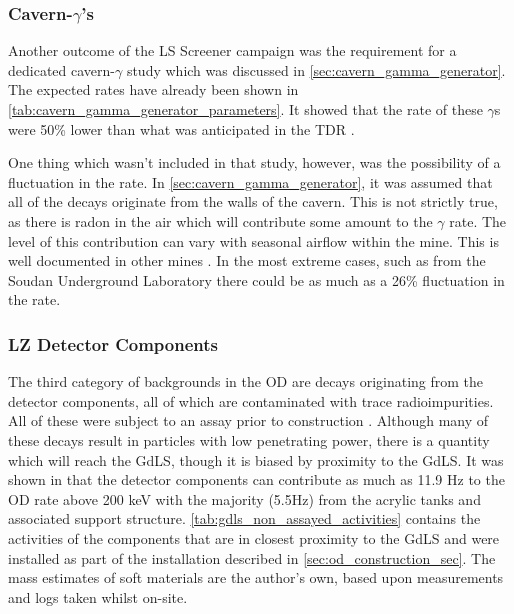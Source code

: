 


\subsubsection{Cavern-$\gamma$'s}
\par
Another outcome of the LS Screener campaign was the requirement for a dedicated cavern-$\gamma$ study which was discussed in \autoref{sec:cavern_gamma_generator}.
The expected rates have already been shown in \autoref{tab:cavern_gamma_generator_parameters}.
It showed that the rate of these $\gamma$s were 50\% lower than what was anticipated in the TDR \cite{LZ_TechnicalDesignReview_ref}.
\par
One thing which wasn't included in that study, however, was the possibility of a fluctuation in the rate.
In \autoref{sec:cavern_gamma_generator}, it was assumed that all of the decays originate from the walls of the cavern.
This is not strictly true, as there is radon in the air which will contribute some amount to the $\gamma$ rate.
The level of this contribution can vary with seasonal airflow within the mine.
This is well documented in other mines \cite{finnish_mine_radon_ref,nepal_mine_radon_ref,minos_annual_modulation_ref}.
In the most extreme cases, such as from the Soudan Underground Laboratory \cite{cavern_gammas_in_Soudan_mine_ref} there could be as much as a 26\% fluctuation in the rate.

\subsubsection{LZ Detector Components}
\par
The third category of backgrounds in the OD are decays originating from the detector components, all of which are contaminated with trace radioimpurities.
All of these were subject to an assay prior to construction \cite{LZ_assay_ref}.
Although many of these decays result in particles with low penetrating power, there is a quantity which will reach the GdLS, though it is biased by proximity to the GdLS.
It was shown in \cite{scotthaselschwardt_thesis_ref} that the detector components can contribute as much as 11.9 Hz to the OD rate above 200 keV with the majority (5.5Hz) from the acrylic tanks and associated support structure.
\autoref{tab:gdls_non_assayed_activities} contains the activities of the components that are in closest proximity to the GdLS and were installed as part of the installation described in \autoref{sec:od_construction_sec}.
The mass estimates of soft materials are the author's own, based upon measurements and logs taken whilst on-site.

